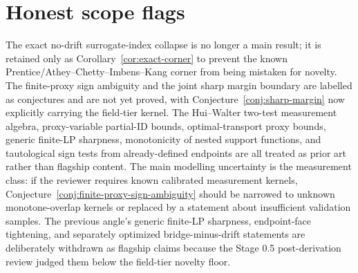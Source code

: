 \documentclass[11pt]{article}
\theoremstyle{definition}
\theoremstyle{plain}
\theoremstyle{remark}
\begin{document}
\section{Honest scope flags}
The exact no-drift surrogate-index collapse is no longer a main result; it is retained only as Corollary~\ref{cor:exact-corner} to prevent the known Prentice/Athey--Chetty--Imbens--Kang corner from being mistaken for novelty.  The finite-proxy sign ambiguity and the joint sharp margin boundary are labelled as conjectures and are not yet proved, with Conjecture~\ref{conj:sharp-margin} now explicitly carrying the field-tier kernel.  The Hui--Walter two-test measurement algebra, proxy-variable partial-ID bounds, optimal-transport proxy bounds, generic finite-LP sharpness, monotonicity of nested support functions, and tautological sign tests from already-defined endpoints are all treated as prior art rather than flagship content.  The main modelling uncertainty is the measurement class: if the reviewer requires known calibrated measurement kernels, Conjecture~\ref{conj:finite-proxy-sign-ambiguity} should be narrowed to unknown monotone-overlap kernels or replaced by a statement about insufficient validation samples.  The previous angle's generic finite-LP sharpness, endpoint-face tightening, and separately optimized bridge-minus-drift statements are deliberately withdrawn as flagship claims because the Stage 0.5 post-derivation review judged them below the field-tier novelty floor.
\end{document}
